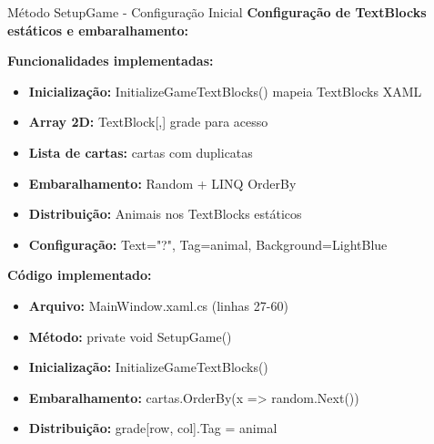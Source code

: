 \documentclass[aspectratio=169]{beamer}
\begin{document}
\begin{frame}{Método SetupGame - Configuração Inicial}
\textbf{Configuração de TextBlocks estáticos e embaralhamento:}

\textbf{Funcionalidades implementadas:}
\begin{itemize}
    \item \textbf{Inicialização:} InitializeGameTextBlocks() mapeia TextBlocks XAML
    \item \textbf{Array 2D:} TextBlock[,] grade para acesso
    \item \textbf{Lista de cartas:} cartas com duplicatas
    \item \textbf{Embaralhamento:} Random + LINQ OrderBy
    \item \textbf{Distribuição:} Animais nos TextBlocks estáticos
    \item \textbf{Configuração:} Text="?", Tag=animal, Background=LightBlue
\end{itemize}

\textbf{Código implementado:}
\begin{itemize}
    \item \textbf{Arquivo:} MainWindow.xaml.cs (linhas 27-60)
    \item \textbf{Método:} private void SetupGame()
    \item \textbf{Inicialização:} InitializeGameTextBlocks()
    \item \textbf{Embaralhamento:} cartas.OrderBy(x => random.Next())
    \item \textbf{Distribuição:} grade[row, col].Tag = animal
\end{itemize}
\end{frame}
\end{document}
